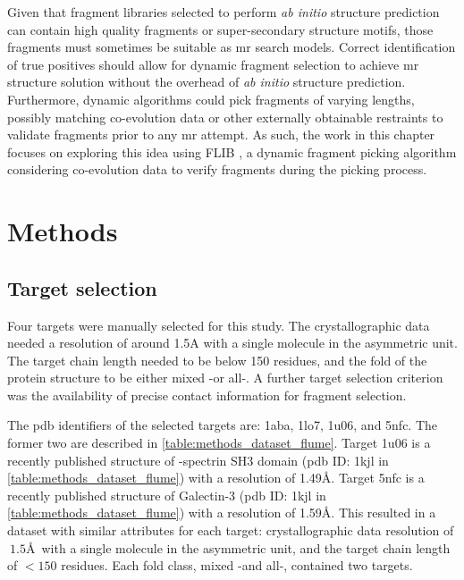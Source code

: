 Given that fragment libraries selected to perform \textit{ab initio} structure prediction can contain high quality fragments or super-secondary structure motifs, those fragments must sometimes be suitable as \gls{mr} search models. Correct identification of true positives should allow for dynamic fragment selection to achieve \gls{mr} structure solution without the overhead of \textit{ab initio} structure prediction. Furthermore, dynamic algorithms could pick fragments of varying lengths, possibly matching co-evolution data or other externally obtainable restraints to validate fragments prior to any \gls{mr} attempt. As such, the work in this chapter focuses on exploring this idea using FLIB \cite{De_Oliveira2015-kb}, a dynamic fragment picking algorithm considering co-evolution data to verify fragments during the picking process.

\section{Methods}
\subsection{Target selection}
Four targets were manually selected for this study. The crystallographic data needed a resolution of around 1.5A with a single molecule in the asymmetric unit. The target chain length needed to be below 150 residues, and the fold of the protein structure to be either mixed \textalpha-\textbeta or all-\textbeta. A further target selection criterion was the availability of precise contact information for fragment selection.

The \gls{pdb} identifiers of the selected targets are: 1aba, 1lo7, 1u06, and 5nfc. The former two are described in \cref{table:methods_dataset_flume}. Target 1u06 is a recently published structure of \textalpha-spectrin SH3 domain (\gls{pdb} ID: 1kjl in \cref{table:methods_dataset_flume}) with a resolution of 1.49\AA. Target 5nfc is a recently published structure of Galectin-3 (\gls{pdb} ID: 1kjl in \cref{table:methods_dataset_flume}) with a resolution of 1.59\AA. This resulted in a dataset with similar attributes for each target: crystallographic data resolution of $~1.5$\AA\ with a single molecule in the asymmetric unit, and the target chain length of $<150$ residues. Each fold class, mixed \textalpha-\textbeta and all-\textbeta, contained two targets.

